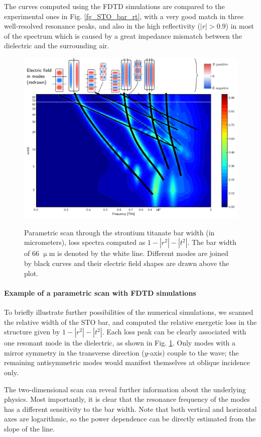 	The curves computed using the FDTD simulations are compared to the experimental ones in Fig. \ref{fg_STO_bar_rt}, with a very good match in three well-resolved resonance peaks, and also in the high reflectivity ($|r| > 0.9$) in most of the spectrum which is caused by a great impedance mismatch between the dielectric and the surrounding air.

\begin{figure}[ht] \centering \caption{Parametric scan through the strontium titanate bar width (in micrometers), loss spectra computed as $1-|r^2|-|t^2|$. The bar width of 66 $\upmu$m is denoted by the white line. Different modes are joined by black curves and their electric field shapes are drawn above the plot.} \includegraphics[width=\textwidth]{img/STOBarC_modes2.pdf} \label{fg_STO_bar_modes} \end{figure}
\paragraph{Example of a parametric scan with FDTD simulations} %
To briefly illustrate further possibilities of the numerical simulations, we scanned the relative width of the STO bar, and computed the relative energetic loss in the structure given by $1-|r^2|-|t^2|$. Each loss peak can be clearly associated with one resonant mode in the dielectric, as shown in Fig. \ref{fg_STO_bar_modes}. Only modes with a mirror symmetry in the transverse direction ($y$-axis) couple to the wave; the remaining antisymmetric modes would manifest themselves at oblique incidence only.

The two-dimensional scan can reveal further information about the underlying physics. Most importantly, it is clear that the resonance frequency of the modes has a different sensitivity to the bar width. Note that both vertical and horizontal axes are logarithmic, so the power dependence can be directly estimated from the slope of the line. 

